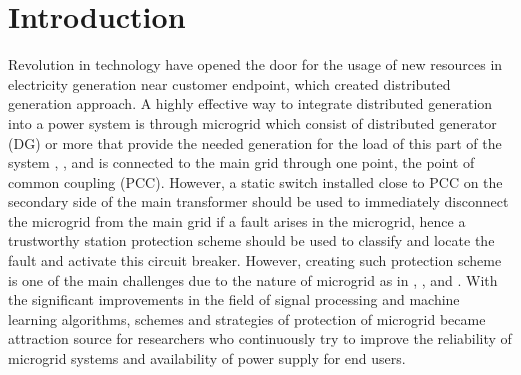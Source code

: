 \documentclass[8pt,a4paper,oneside]{elsarticle}
\begin{document}
\maketitle

\section{Introduction}
Revolution in technology have opened the door for the usage of new resources in electricity generation near customer endpoint, which created distributed generation approach. A highly effective way to integrate distributed generation into a power system is through microgrid which consist of distributed generator (DG) or more that provide the needed generation for the load of this part of the system \cite{Rath_Panda_Ray_Mohanty_2021_1}, \cite{Review_and_Analysis_of_Existing_Protection_3}, \cite{9179273_4}and is
connected to the main grid through one point, the point of common coupling (PCC). However, a static switch installed close to PCC on the secondary side of the main transformer should be used to immediately disconnect the microgrid from the main grid if a fault arises in the microgrid, hence a trustworthy station protection scheme should be used to classify and locate the fault and activate this circuit breaker. However, creating such protection scheme is one of the main challenges due to the nature of microgrid as in \cite{Gopalan_Sreeram_Iu_2014_2}, \cite{9648165_5}, \cite{KENNEDY20161308_6} and \cite{BREARLEY2017988_7}. With the significant improvements in the field of signal processing and machine learning algorithms, schemes and strategies of protection of microgrid became attraction source for researchers who continuously try to improve the reliability of microgrid systems and availability of power supply for end users.
\end{document}
